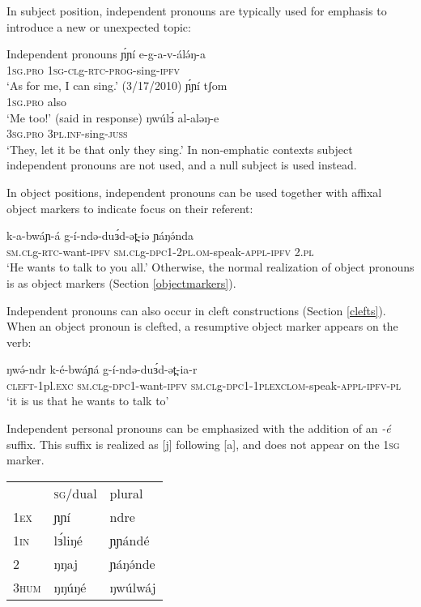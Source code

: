 In subject position, independent pronouns are typically used for emphasis to introduce a new or unexpected topic:

\ea Independent pronouns
	\ea \gll ɲ́ɲí e-g-a-v-álə́ŋ-a\\
			1\textsc{sg}.\textsc{pro} 1\textsc{sg}-\textsc{cl}g-\textsc{rtc}-\textsc{prog}-sing-\textsc{ipfv}\\
		\glt `As for me, I can sing.'	 (3/17/2010)
	\ex \gll ɲ́ɲí tʃom\\
			1\textsc{sg}.\textsc{pro} also\\
		\glt	`Me too!' 	(said in response)
	\ex \gll ŋwúlɜ́ al-aləŋ-e		\\
			 3\textsc{sg}.\textsc{pro} 3\textsc{pl}.\textsc{inf}-sing-\textsc{juss}\\
		\glt `They, let it be that only they sing.'
	\z
\z
In non-emphatic contexts subject independent pronouns are not used, and a null subject is used instead.

In object positions, independent pronouns can be used together with affixal object markers to indicate focus on their referent:

\ea 
	\gll	 k-a-bwáɲ-á   g-í-ndə-duɜ́d-ət̪-iə                    ɲáŋə́nda\\
	\textsc{sm}.\textsc{cl}g-\textsc{rtc}-want-\textsc{ipfv}   \textsc{sm}.\textsc{cl}g-\textsc{dpc}1-2\textsc{pl.om}-speak-\textsc{appl}-\textsc{ipfv}  2.\textsc{pl}\\
	\glt	‘He wants to talk to you all.’
\z
Otherwise, the normal realization of object pronouns is as object markers (Section \ref{objectmarkers}). 
	
Independent pronouns can also occur in cleft constructions (Section \ref{clefts}). When an object pronoun is clefted, a resumptive object marker appears on the verb:

\ea	\gll	ŋwə́-ndr            k-é-bwáɲá                    g-í-ndə-duɜ́d-ət̪-ia-r\\
	\textsc{cleft}-1pl.\textsc{exc}  \textsc{sm.cl}g-\textsc{dpc}1-want-\textsc{ipfv}  \textsc{sm.cl}g-\textsc{dpc}1-1\textsc{plexclom}-speak-\textsc{appl}-\textsc{ipfv}-\textsc{pl}\\
	\glt	‘it is us that he wants to talk to’
\z

Independent personal pronouns can be emphasized with the addition of an \textit{-é} suffix. This suffix is realized as [j] following [a], and does not appear on the 1\textsc{sg} marker. 

\ea 
\begin{tabular}[t]{lll}
		&	\textsc{sg}/dual & plural \\
\textsc{1ex}		&	ɲɲí	& ndre\\
\textsc{1in }	&	lɜ́liŋé & ɲɲándé\\
\textsc{2	}	&	ŋŋaj	& ɲáŋə́nde \\
\textsc{3hum}	&	ŋŋúŋé & ŋwúlwáj\\
\end{tabular}
\z


